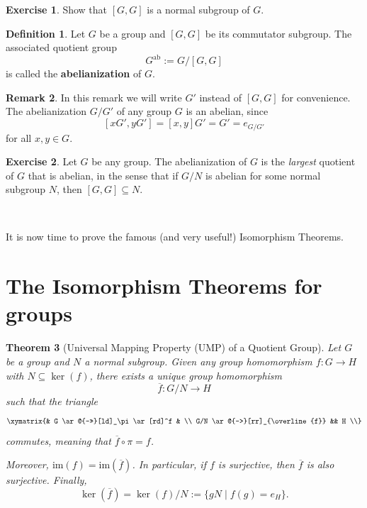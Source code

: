 \documentclass[12pt]{report}
\newtheorem{theorem}{Theorem}[chapter]
\numberwithin{equation}{section}
\numberwithin{theorem}{chapter}
\theoremstyle{definition}
\newtheorem{definition}[theorem]{Definition}
\newtheorem{exercise}{Exercise}
\newtheorem*{basic properties}{Basic Properties}
\newtheorem*{Important Remark}{Important Remark}
\newtheorem{remark}[theorem]{Remark}
\newcommand{\df}[1]{{\bf #1}\index{#1}}
\renewcommand{\ker}{\operatorname{ker}}
\begin{document}
\begin{exercise}
	Show that $[G,G]$ is a normal subgroup of $G$. 
\end{exercise}
  
  
\begin{definition}\label{abelianization of a group}
Let $G$ be a group and $[G,G]$ be its commutator subgroup. The associated quotient group 
$$G^{\textrm{ab}} := G/[G,G]$$ 
is called the \df{abelianization} of $G$.
\end{definition}  


\begin{remark}
In this remark we will write $G'$ instead of $[G,G]$ for convenience.
The abelianization $G/G'$ of any group $G$ is an abelian, since 
$$[xG', yG'] = [x,y]G' = G' = e_{G/G'}$$ 
for all $x,y \in G$.
\end{remark}

\begin{exercise}
	Let $G$ be any group. The abelianization of $G$ is the \emph{largest} quotient of $G$ that is abelian, in the sense that if $G/N$ is abelian for some normal subgroup $N$, then $[G,G] \subseteq N$.
\end{exercise}


\


It is now time to prove the famous (and very useful!) Isomorphism Theorems.


\section{The Isomorphism Theorems for groups}



\begin{theorem}[Universal Mapping Property (UMP) of a Quotient Group]\label{UMP quotient group}
Let $G$ be a group and $N$ a normal subgroup. Given any group homomorphism $f\!: G \to H$ with $N \subseteq \ker(f)$, there exists a unique group homomorphism 
$$\overline{f}: G/N \to H$$ 
such that the triangle
$$\xymatrix{& G \ar@{->>}[ld]_\pi \ar[rd]^f  & \\
G/N \ar@{-->}[rr]_{\overline{f}}  && H \\}$$
commutes, meaning that $\overline{f} \circ \pi = f$.

\vspace{0.5em}

Moreover, $\mathrm{im}(f) = \mathrm{im}(\overline{f})$. In particular, if $f$ is surjective, then $\overline{f}$ is also surjective. Finally,
$$\ker(\overline{f}) = \ker(f)/N := \{ g N \mid f(g) = e_H\}.$$
\end{theorem}
\end{document}

